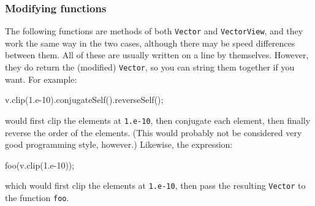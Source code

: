 \documentclass[twoside,letterpaper,11pt]{article}
\renewcommand{\tt}[1]{{\lstinline {#1}}}
\begin{document}
\subsubsection{Modifying functions}

The following functions are methods of both \tt{Vector} and \tt{VectorView},
and they work the same way in the two cases, although there may be speed differences
between them.  
All of these are usually written on a line by themselves.  However, they do
return the (modified) \tt{Vector}, so you can string them together if you want.
For example:
\begin{tmvcode}
v.clip(1.e-10).conjugateSelf().reverseSelf();
\end{tmvcode}
would first clip the elements at \tt{1.e-10}, then conjugate each element, then finally reverse the
order of the elements.  (This would probably not be considered 
very good programming style, however.)
Likewise, the expression:
\begin{tmvcode}
foo(v.clip(1.e-10));
\end{tmvcode}
which would first clip the elements at \tt{1.e-10},
then pass the resulting \tt{Vector} to the function \tt{foo}.  
\end{document}
